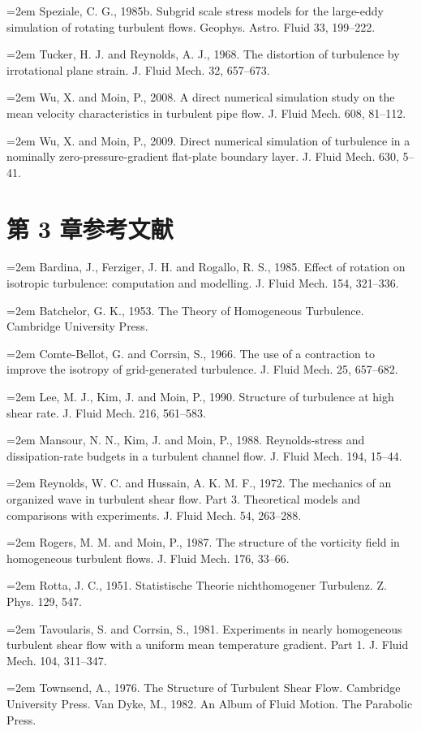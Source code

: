 \documentclass[12pt,a4paper,openany,fontset=none]{ctexbook}
\begin{document}
\par\hangindent=2em Speziale, C. G., 1985b. Subgrid scale stress models for the large-eddy simulation of rotating turbulent flows. Geophys. Astro. Fluid 33, 199–222.
\par\hangindent=2em Tucker, H. J. and Reynolds, A. J., 1968. The distortion of turbulence by irrotational plane strain. J. Fluid Mech. 32, 657–673.
\par\hangindent=2em Wu, X. and Moin, P., 2008. A direct numerical simulation study on the mean velocity characteristics in turbulent pipe flow. J. Fluid Mech. 608, 81–112.
\par\hangindent=2em Wu, X. and Moin, P., 2009. Direct numerical simulation of turbulence in a nominally zero-pressure-gradient flat-plate boundary layer. J. Fluid Mech. 630, 5–41.
\section*{第 3 章参考文献}
\par\hangindent=2em Bardina, J., Ferziger, J. H. and Rogallo, R. S., 1985. Effect of rotation on isotropic turbulence: computation and modelling. J. Fluid Mech. 154, 321–336.
\par\hangindent=2em Batchelor, G. K., 1953. The Theory of Homogeneous Turbulence. Cambridge University Press.
\par\hangindent=2em Comte-Bellot, G. and Corrsin, S., 1966. The use of a contraction to improve the isotropy of grid-generated turbulence. J. Fluid Mech. 25, 657–682.
\par\hangindent=2em Lee, M. J., Kim, J. and Moin, P., 1990. Structure of turbulence at high shear rate. J. Fluid Mech. 216, 561–583.
\par\hangindent=2em Mansour, N. N., Kim, J. and Moin, P., 1988. Reynolds-stress and dissipation-rate budgets in a turbulent channel flow. J. Fluid Mech. 194, 15–44.
\par\hangindent=2em Reynolds, W. C. and Hussain, A. K. M. F., 1972. The mechanics of an organized wave in turbulent shear flow. Part 3. Theoretical models and comparisons with experiments. J. Fluid Mech. 54, 263–288.
\par\hangindent=2em Rogers, M. M. and Moin, P., 1987. The structure of the vorticity field in homogeneous turbulent flows. J. Fluid Mech. 176, 33–66.
\par\hangindent=2em Rotta, J. C., 1951. Statistische Theorie nichthomogener Turbulenz. Z. Phys. 129, 547.
\par\hangindent=2em Tavoularis, S. and Corrsin, S., 1981. Experiments in nearly homogeneous turbulent shear flow with a uniform mean temperature gradient. Part 1. J. Fluid Mech. 104, 311–347.
\par\hangindent=2em Townsend, A., 1976. The Structure of Turbulent Shear Flow. Cambridge University Press. Van Dyke, M., 1982. An Album of Fluid Motion. The Parabolic Press.
\end{document}
